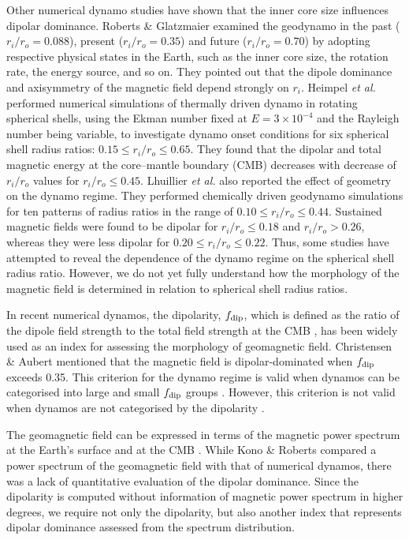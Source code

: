 Other numerical dynamo studies have shown that the inner core size influences dipolar dominance. 
Roberts \& Glatzmaier  examined the geodynamo in the past ($r_i / r_o = 0.088$), present ($r_i / r_o = 0.35$) and future ($r_i / r_o = 0.70$) by adopting respective physical states in the Earth, such as the inner core size, the rotation rate, the energy source, and so on.
They pointed out that the dipole dominance and axisymmetry of the magnetic field depend strongly on $r_i$.
Heimpel {\it et al.}  performed numerical simulations of thermally driven dynamo in rotating spherical shells, using the Ekman number fixed at $E = 3 \times 10^{-4}$ and the Rayleigh number being variable, to investigate dynamo onset conditions for six spherical shell radius ratios:
$0.15 \le r_{i} / r_{o} \le 0.65$.
They found that the dipolar and total magnetic energy at the core–mantle boundary (CMB) decreases with decrease of $r_{i} / r_{o}$ values for
$r_{i} / r_{o} \le 0.45$.
Lhuillier {\it et al.}  also reported the effect of geometry on the dynamo regime. 
They performed chemically driven geodynamo simulations for ten patterns of radius ratios in the range of 
$0.10 \le r_{i} / r_{o} \le 0.44$.
Sustained magnetic fields were %
found to be 
dipolar for  $r_{i} / r_{o} \le 0.18$ and  $r_{i} / r_{o} > 0.26$, whereas they were less dipolar for $0.20 \le r_{i} / r_{o} \le 0.22$. 
Thus, some studies have attempted to reveal the dependence of the dynamo regime on the spherical shell radius ratio.
However, 
we do not yet fully understand how the morphology of the magnetic field is determined in relation to spherical shell radius ratios.

In recent numerical dynamos, the dipolarity, $f_{\rm dip}$, which is defined as the ratio of the dipole field strength to the total field strength at the CMB \cite{Uli:2006}, has been widely used as an index for assessing the morphology of geomagnetic field. 
Christensen \& Aubert  mentioned that the magnetic field is dipolar-dominated when $f_{\rm dip}$ exceeds 0.35. 
This criterion for the dynamo regime is valid when dynamos can be categorised into large and small $f_{\rm dip}$ groups \cite{Soderlund:2012}. However, this criterion is not valid when dynamos are not categorised by the dipolarity \cite{Aubert:2009}. 

The geomagnetic field can be expressed in terms of the magnetic power spectrum at the Earth’s surface \cite{Lowes:1974} and at the CMB \cite{Langel:1982}. 
While Kono \& Roberts  compared a power spectrum of the geomagnetic field with that of numerical dynamos, there was a lack of quantitative evaluation of the dipolar dominance. 
Since the dipolarity 
is computed without 
information of magnetic power spectrum in higher degrees, we require not only the dipolarity, but also another index that represents dipolar dominance assessed from the spectrum distribution.

